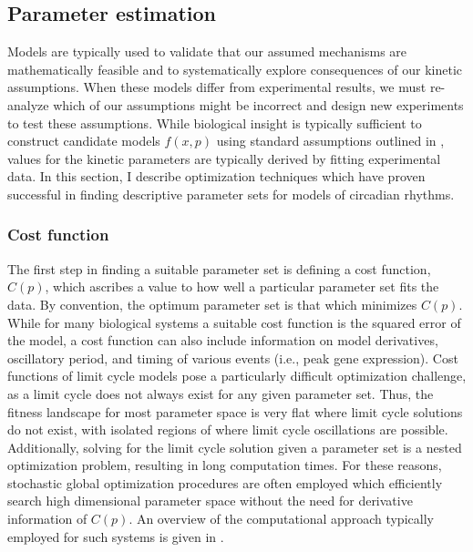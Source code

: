 \subsection{Parameter estimation}

Models are typically used to validate that our assumed mechanisms are mathematically feasible and to systematically explore consequences of our kinetic assumptions.
When these models differ from experimental results, we must re-analyze which of our assumptions might be incorrect and design new experiments to test these assumptions.
While biological insight is typically sufficient to construct candidate models $f(x, p)$ using standard assumptions outlined in , values for the kinetic parameters are typically derived by fitting experimental data.
In this section, I describe optimization techniques which have proven successful in finding descriptive parameter sets for models of circadian rhythms.

\subsubsection{Cost function}
The first step in finding a suitable parameter set is defining a cost function, $C(p)$, which ascribes a value to how well a particular parameter set fits the data.
By convention, the optimum parameter set is that which minimizes $C(p)$.
While for many biological systems a suitable cost function is the squared error of the model, a cost function can also include information on model derivatives, oscillatory period, and timing of various events (i.e., peak gene expression).
Cost functions of limit cycle models pose a particularly difficult optimization challenge, as a limit cycle does not always exist for any given parameter set.
Thus, the fitness landscape for most parameter space is very flat where limit cycle solutions do not exist, with isolated regions of  where limit cycle oscillations are possible.
Additionally, solving for the limit cycle solution given a parameter set is a nested optimization problem, resulting in long computation times.
For these reasons, stochastic global optimization procedures are often employed which efficiently search high dimensional parameter space without the need for derivative information of $C(p)$.
An overview of the computational approach typically employed for such systems is given in .

